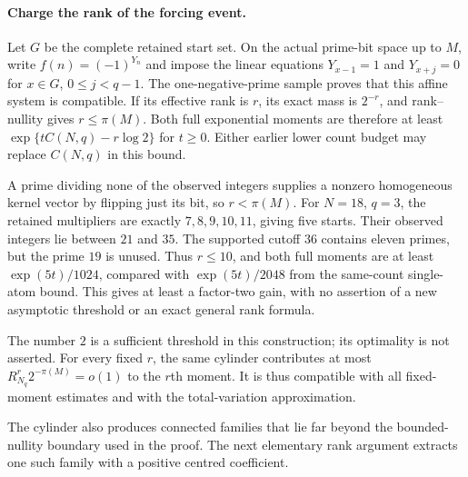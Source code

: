 \paragraph{Charge the rank of the forcing event.}
Let $G$ be the complete retained start set.  On the actual prime-bit
space up to $M$, write $f(n)=(-1)^{Y_n}$ and impose the linear equations
$Y_{x-1}=1$ and $Y_{x+j}=0$ for $x\in G$, $0\leq j<q-1$.
The one-negative-prime sample proves that this affine system is
compatible.  If its effective rank is $r$, its exact mass is $2^{-r}$,
and rank--nullity gives $r\leq\pi(M)$.  Both full exponential moments
are therefore at least $\exp\{tC(N,q)-r\log2\}$ for $t\geq0$.
Either earlier lower count budget may replace $C(N,q)$ in this bound.

A prime dividing none of the observed integers supplies a nonzero
homogeneous kernel vector by flipping just its bit, so $r<\pi(M)$.
For $N=18$, $q=3$, the retained multipliers are exactly $7,8,9,10,11$,
giving five starts.  Their observed integers lie between $21$ and $35$.
The supported cutoff $36$ contains eleven primes, but the prime $19$
is unused.  Thus $r\leq10$, and both full moments are at least
$\exp(5t)/1024$, compared with $\exp(5t)/2048$ from the same-count
single-atom bound.  This gives at least a factor-two gain, with no
assertion of a new asymptotic threshold or an exact general rank formula.

The number $2$ is a sufficient threshold in this construction;
its optimality is not asserted.  For every fixed $r$, the same
cylinder contributes at most $R_{N_q}^r2^{-\pi(M)}=o(1)$ to
the $r$th moment.  It is thus compatible with all fixed-moment
estimates and with the total-variation approximation.

The cylinder also produces connected families that lie far beyond
the bounded-nullity boundary used in the proof.  The next elementary
rank argument extracts one such family with a positive centred
coefficient.

